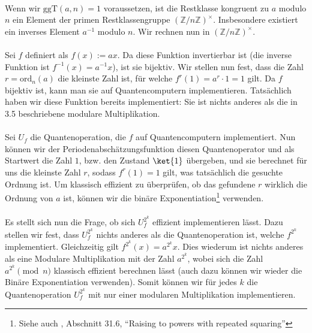 \paragraph{}
Wenn wir $\text{ggT}(a, n) = 1$ voraussetzen, ist die Restklasse kongruent zu $a$ modulo $n$ ein Element der primen Restklassengruppe $(\mathbb {Z}/n\mathbb {Z} )^{\times}$. Insbesondere existiert ein inverses Element $a^{-1}$ modulo $n$. Wir rechnen nun in $(\mathbb {Z}/n\mathbb {Z})^{\times}$.
\paragraph{}
Sei $f$ definiert als $f(x) := ax$. Da diese Funktion invertierbar ist (die inverse Funktion ist $f^{-1}(x) = a^{-1}x$), ist sie bijektiv. Wir stellen nun fest, dass die Zahl $r = \text{ord}_n(a)$ die kleinste Zahl ist, für welche $f^r(1) = a^r\cdot 1 = 1$ gilt. Da $f$ bijektiv ist, kann man sie auf Quantencomputern implementieren. Tatsächlich haben wir diese Funktion bereits implementiert: Sie ist nichts anderes als die in 3.5 beschriebene modulare Multiplikation.

\paragraph{}
Sei $U_f$ die Quantenoperation, die $f$ auf Quantencomputern implementiert. Nun können wir der Periodenabschätzungsfunktion diesen Quantenoperator und als Startwert die Zahl $1$, bzw. den Zustand $\ket{1}$ übergeben, und sie berechnet für uns die kleinste Zahl $r$, sodass $f^r(1) = 1$ gilt, was tatsächlich die gesuchte Ordnung ist. Um klassisch effizient zu überprüfen, ob das gefundene $r$ wirklich die Ordnung von $a$ ist, können wir die binäre Exponentiation\footnote{Siehe auch \cite{clrs}, Abschnitt 31.6, "`Raising to powers with repeated squaring"'} verwenden.
\paragraph{}
Es stellt sich nun die Frage, ob sich $U_f^{2^k}$ effizient implementieren lässt. Dazu stellen wir fest, dass $U_f^{2^k}$ nichts anderes als die Quantenoperation ist, welche $f^{2^k}$ implementiert. Gleichzeitig gilt $f^{2^k}(x) = a^{2^k}x$. Dies wiederum ist nichts anderes als eine Modulare Multiplikation mit der Zahl $a^{2^k}$, wobei sich die Zahl $a^{2^k} \pmod{n}$ klassisch effizient berechnen lässt (auch dazu können wir wieder die Binäre Exponentiation verwenden). Somit können wir für jedes $k$ die Quantenoperation $U_f^{2^k}$ mit nur einer modularen Multiplikation implementieren.
